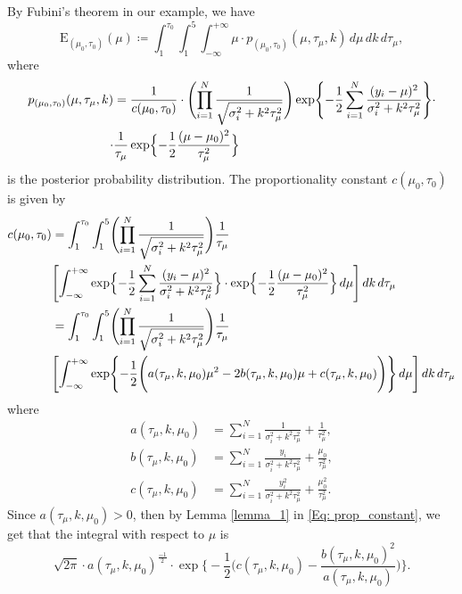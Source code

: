 \documentclass{amsart}
\theoremstyle{plain}%
\begin{document}
By Fubini's theorem in our example, we have 
\begin{equation}
	\mathrm{E}_{(\mu_0, \tau_0)}(\mu) \coloneqq \displaystyle
	\int_{1}^{\tau_0} \int_1^5 \int_{- \infty}^{+\infty}  \mu \cdot p_{(\mu_0, \tau_0)}(\mu,\tau_\mu,k) \,d\mu \,dk \,d\tau_\mu, \label{Eq:expectation}
\end{equation}
where 
\begin{align*}
	p_{(\mu_0, \tau_0)}(\mu,\tau_\mu,k) &= \frac{1}{c(\mu_0,\tau_0)} \cdot \Biggl(\prod_{i=1}^N  \frac{1}{\sqrt{\sigma^2_i + k^2\tau_\mu^2}}\Biggr)
	\exp  \Biggl\{ -\frac{1}{2} \sum_{i = 1}^N \frac{(y_i - \mu)^2}{\sigma^2_i + k^2\tau_\mu^2} \Biggr\} \cdot\\ \cdot
	& \frac{1}{ \tau_\mu} \exp  \Bigl\{ -\frac{1}{2}\frac{(\mu - \mu_0)^2}{\tau_\mu^2} \Bigr\}  \nonumber
\end{align*}
is the posterior probability distribution. The proportionality constant $c(\mu_0,\tau_0)$ is given by 
\begin{align}
\label{Eq: prop_constant}
	c(\mu_0,\tau_0)  & =  \int_{1}^{\tau_0} \int_1^5 
	\Biggl( \prod_{i=1}^N \frac{1}{\sqrt{\sigma^2_i + k^2\tau_\mu^2}}\Biggr)
	 \frac{1}{\tau_\mu} \\
	& \Biggl[ \int_{- \infty}^{+\infty} 
	\exp  \Bigl\{-\frac{1}{2} \sum_{i = 1}^N \frac{(y_i - \mu)^2}{\sigma^2_i + k^2\tau_\mu^2} \Bigr\} \cdot 
	 \exp  \Bigl\{ -\frac{1}{2}\frac{(\mu - \mu_0)^2}{\tau_\mu^2} \Bigr\} 
	  \,d\mu \Biggr ] \,dk  \,d\tau_\mu \nonumber \\ 
	&= \int_{1}^{\tau_0} \int_1^5 
	\Biggl( \prod_{i=1}^N \frac{1}{\sqrt{\sigma^2_i + k^2\tau_\mu^2}}\Biggr)
	 \frac{1}{ \tau_\mu} \\
	& \Biggl[ \int_{- \infty}^{+\infty} 
	\exp  \Biggl\{-\frac{1}{2} \Biggl( a(\tau_\mu, k, \mu_0)\mu^2 -2b(\tau_\mu, k, \mu_0) \mu + c(\tau_\mu, k, \mu_0)\Biggr)  \Biggr\} 
	  \,d\mu \Biggr ] \,dk  \,d\tau_\mu \nonumber   
\end{align}
where
\begin{align}
	a(\tau_\mu, k, \mu_0) & = \sum_{i =1}^N \frac{1}{\sigma_i^2 + k^2\tau_\mu^2} + \frac{1}{\tau_\mu^2}, \label{Eq:a} \\ 
	b(\tau_\mu, k, \mu_0) & = \sum_{i =1}^N \frac{y_i}{\sigma_i^2 + k^2\tau_\mu^2} + \frac{\mu_0}{\tau_\mu^2}, \label{Eq:b}\\
	c(\tau_\mu, k, \mu_0) & = \sum_{i =1}^N \frac{y_i^2}{\sigma_i^2 + k^2\tau_\mu^2} + \frac{\mu_0^2}{\tau_\mu^2} \label{Eq:c}.
\end{align}
Since $a(\tau_\mu, k, \mu_0) > 0$, then by Lemma \ref{lemma_1} 
in \eqref{Eq: prop_constant}, we get that the integral with respect to $\mu$ is  
\begin{equation}
	\sqrt{2\pi}\cdot a(\tau_\mu, k, \mu_0)^{\frac{-1}{2}} \cdot \exp \Biggl\{-\frac{1}{2} \Biggl(c(\tau_\mu, k, \mu_0) - \frac{b(\tau_\mu, k, \mu_0)^2}{a(\tau_\mu, k, \mu_0)}\Biggr)\Biggr\}.
\end{equation}
\end{document}
